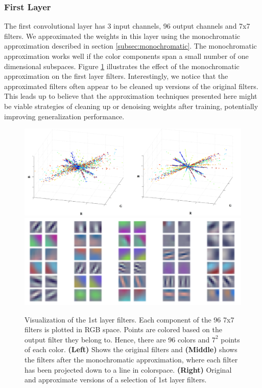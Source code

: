 \subsubsection{First Layer}

The first convolutional layer has 3 input channels, 96
output channels and 7x7 filters.  We approximated the weights in this
layer using the monochromatic approximation described in section
\ref{subsec:monochromatic}. The monochromatic approximation works well if
the color components span a small number of one dimensional
subspaces. Figure \ref{fig:RGB_components} illustrates the effect of the monochromatic approximation on the first layer filters. 
Interestingly, we
notice that the approximated filters often appear to be cleaned up
versions of the original filters. This leads up to believe that the
approximation techniques presented here might be viable strategies of
cleaning up or denoising weights after training, potentially improving generalization performance.

\begin{figure}[t]
\centering
\begin{minipage}{\textwidth}
	\includegraphics[width=0.5\linewidth]{img/RGB_components_stacked.pdf}
	\includegraphics[width=0.5\linewidth]{img/denoised_stacked.pdf} 
\end{minipage}
\vspace{-3mm}
\label{fig:RGB_components}
\caption{Visualization of the 1st layer filters. Each component of the 96 7x7 filters is plotted in RGB space. Points are colored based on the output filter they belong to. Hence, there are 96 colors and $7^2$ points of each color. {\bf (Left)} Shows the
  original filters and {\bf (Middle)} shows the filters after the monochromatic approximation, where each filter has been projected down to a line in colorspace. {\bf (Right)} Original and approximate versions of a selection of 1st layer filters.}
\end{figure}


